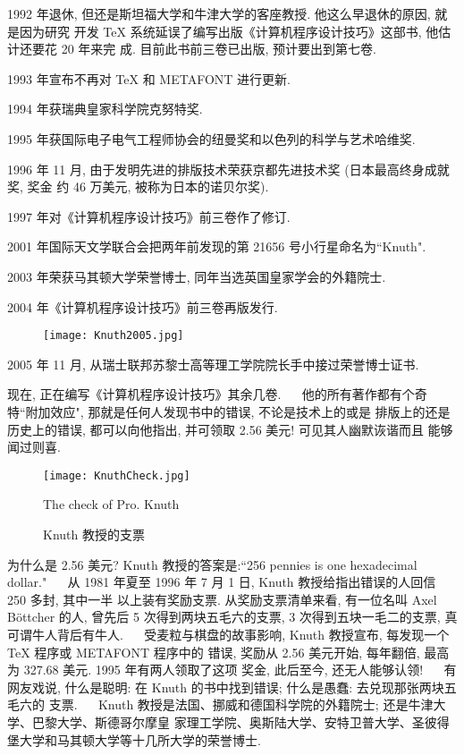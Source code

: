 1992 年退休, 但还是斯坦福大学和牛津大学的客座教授. 他这么早退休的原因, 就是因为研究
开发 \TeX{} 系统延误了编写出版《计算机程序设计技巧》这部书, 他估计还要花 20 年来完
成. 目前此书前三卷已出版, 预计要出到第七卷.

1993 年宣布不再对 \TeX{} 和 METAFONT 进行更新.

1994 年获瑞典皇家科学院克努特奖.

1995 年获国际电子电气工程师协会的纽曼奖和以色列的科学与艺术哈维奖.

1996 年 11 月, 由于发明先进的排版技术荣获京都先进技术奖 (日本最高终身成就奖, 奖金
约 46 万美元, 被称为日本的诺贝尔奖).

1997 年对《计算机程序设计技巧》前三卷作了修订.

2001 年国际天文学联合会把两年前发现的第 21656 号小行星命名为``Knuth".

2003 年荣获马其顿大学荣誉博士, 同年当选英国皇家学会的外籍院士.

2004 年《计算机程序设计技巧》前三卷再版发行.

\begin{figure}
  \centering
  \texttt{[image: Knuth2005.jpg]}\\
\end{figure}

2005 年 11 月, 从瑞士联邦苏黎士高等理工学院院长手中接过荣誉博士证书.

现在, 正在编写《计算机程序设计技巧》其余几卷.
　
他的所有著作都有个奇特``附加效应", 那就是任何人发现书中的错误, 不论是技术上的或是
排版上的还是历史上的错误, 都可以向他指出, 并可领取 2.56 美元! 可见其人幽默诙谐而且
能够闻过则喜.

\begin{figure}
  \centering
  \texttt{[image: KnuthCheck.jpg]}\\
  \caption{Knuth 教授的支票}{The check of Pro. Knuth}
\end{figure}


为什么是 2.56 美元? Knuth 教授的答案是:``256 pennies is one hexadecimal dollar."
　
从 1981 年夏至 1996 年 7 月 1 日, Knuth 教授给指出错误的人回信 250 多封, 其中一半
以上装有奖励支票. 从奖励支票清单来看, 有一位名叫 Axel B\"{o}ttcher  的人, 曾先后 5
次得到两块五毛六的支票, 3 次得到五块一毛二的支票, 真可谓牛人背后有牛人.
　
受麦粒与棋盘的故事影响, Knuth 教授宣布, 每发现一个 \TeX{} 程序或 METAFONT 程序中的
错误, 奖励从 2.56 美元开始, 每年翻倍, 最高为 327.68 美元. 1995 年有两人领取了这项
奖金, 此后至今, 还无人能够认领!
　
有网友戏说, 什么是聪明: 在 Knuth 的书中找到错误; 什么是愚蠢: 去兑现那张两块五毛六的
支票.
　
Knuth 教授是法国、挪威和德国科学院的外籍院士; 还是牛津大学、巴黎大学、斯德哥尔摩皇
家理工学院、奥斯陆大学、安特卫普大学、圣彼得堡大学和马其顿大学等十几所大学的荣誉博士.

